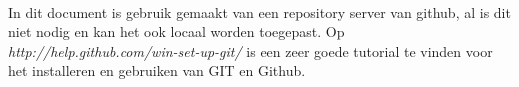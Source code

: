\documentclass[12pt,a4paper]{report}
\begin{document}
\begin{flushleft}
\paragraph*{}
In dit document is gebruik gemaakt van een repository server van github, al is dit niet nodig en kan het ook locaal worden toegepast.
\linebreak
Op \textit{http://help.github.com/win-set-up-git/} is een zeer goede tutorial te vinden voor het installeren en gebruiken van GIT en Github.
\end{flushleft}
\end{document}
